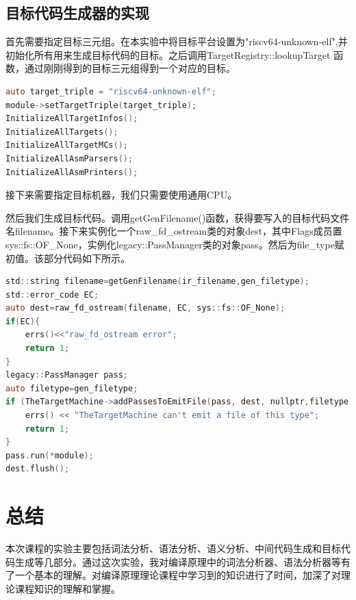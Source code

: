 \documentclass[supercite]{Experimental_Report}
\theoremstyle{definition}
\begin{document}
\subsection{目标代码生成器的实现}
首先需要指定目标三元组。在本实验中将目标平台设置为"riscv64-unknown-elf",并初始化所有用来生成目标代码的目标。之后调用TargetRegistry::lookupTarget 函数，通过刚刚得到的目标三元组得到一个对应的目标。
\begin{lstlisting}[float=htb,language=C]
auto target_triple = "riscv64-unknown-elf";
module->setTargetTriple(target_triple);
InitializeAllTargetInfos();
InitializeAllTargets();
InitializeAllTargetMCs();
InitializeAllAsmParsers();
InitializeAllAsmPrinters();
\end{lstlisting}

接下来需要指定目标机器，我们只需要使用通用CPU。

然后我们生成目标代码。调用getGenFilename()函数，获得要写入的目标代码文件名filename。接下来实例化一个raw\_fd\_ostream类的对象dest，其中Flags成员置sys::fs::OF\_None，实例化legacy::PassManager类的对象pass。然后为file\_type赋初值。该部分代码如下所示。
\begin{lstlisting}[language=C]
std::string filename=getGenFilename(ir_filename,gen_filetype);
std::error_code EC;
auto dest=raw_fd_ostream(filename, EC, sys::fs::OF_None);
if(EC){
    errs()<<"raw_fd_ostream error";
    return 1;
}
legacy::PassManager pass;
auto filetype=gen_filetype;
if (TheTargetMachine->addPassesToEmitFile(pass, dest, nullptr,filetype)) {
    errs() << "TheTargetMachine can't emit a file of this type";
    return 1;
}
pass.run(*module);
dest.flush();
\end{lstlisting}

\newpage
\section{总结}
本次课程的实验主要包括词法分析、语法分析、语义分析、中间代码生成和目标代码生成等几部分。通过这次实验，我对编译原理中的词法分析器、语法分析器等有了一个基本的理解。对编译原理理论课程中学习到的知识进行了时间，加深了对理论课程知识的理解和掌握。
\end{document}
